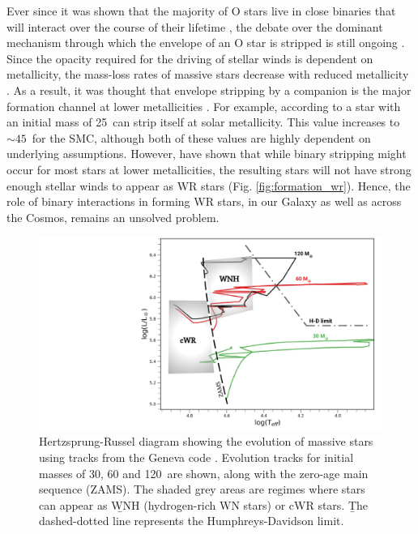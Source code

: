 Ever since it was shown that the majority of O stars live in close binaries that will interact over the course of their lifetime \citep{sana_binary_2012}, the debate over the dominant mechanism through which the envelope of an O star is stripped is still ongoing \citep{vanbeveren_wr_1998,foellmi_wolf-rayet_2003,shenar_wolf-rayet_2019,neugent_close_2014,shenar_why_2020}. Since the opacity required for the driving of stellar winds is dependent on metallicity, the mass-loss rates of massive stars decrease with reduced metallicity \citep{vink_mass-loss_2001,vink_metallicity_2005,hainich_wolf-rayet_2015,shenar_wolf-rayet_2019}. As a result, it was thought that envelope stripping by a companion is the major formation channel at lower metallicities \citep{maeder_new_1994,smith_mass_2014,groh_grids_2019}. For example, according to \citet{meynet_stellar_2003,meynet_stellar_2005} a star with an initial mass of 25\,\Msun{} can strip itself at solar metallicity. This value increases to ${\sim}45\,$\Msun{} for the SMC, although both of these values are highly dependent on underlying assumptions. However, \citet{shenar_why_2020} have shown that while binary stripping might occur for most stars at lower metallicities, the resulting stars will not have strong enough stellar winds to appear as WR stars (Fig. \ref{fig:formation_wr}). Hence, the role of binary interactions in forming WR stars, in our Galaxy as well as across the Cosmos, remains an unsolved problem.

\begin{figure}
    \centering
    \includegraphics[width=\hsize]{chapters/introduction/image/HRD_GENEVA.pdf}
    \caption{Hertzsprung-Russel diagram showing the evolution of massive stars using tracks from the Geneva code \citep{2012Ekstrom}. Evolution tracks for initial masses of 30, 60 and 120\,\Msun{} are shown, along with the zero-age main sequence (ZAMS). The shaded grey areas are regimes where stars can appear as \b{WNH (hydrogen-rich WN stars)} or cWR stars. \b{The dashed-dotted line represents the Humphreys-Davidson limit.}}
    \label{fig:hrd_geneva}
\end{figure}

